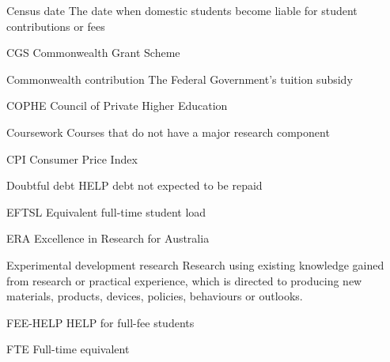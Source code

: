 \documentclass{grattan}
\begin{document}
Census date The date when domestic students become liable for student contributions or fees

CGS Commonwealth Grant Scheme

Commonwealth contribution The Federal Government's tuition subsidy

COPHE Council of Private Higher Education

Coursework Courses that do not have a major research component

CPI Consumer Price Index

Doubtful debt HELP debt not expected to be repaid

EFTSL Equivalent full-time student load

ERA Excellence in Research for Australia

Experimental development research Research using existing knowledge gained from research or practical experience, which is directed to producing new materials, products, devices, policies, behaviours or outlooks.

FEE-HELP HELP for full-fee students

FTE Full-time equivalent
\end{document}
